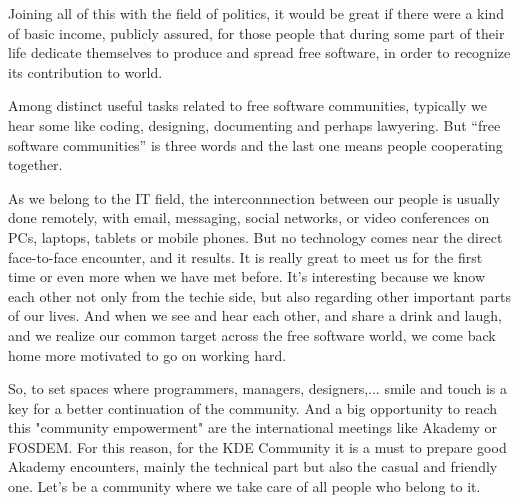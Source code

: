 Joining all of this with the field of politics, it would be great if there were a kind of basic income, publicly assured, for those people that during some part of their life dedicate themselves to produce and spread free software, in order to recognize its contribution to world.

Among distinct useful tasks related to free software communities, typically we hear some like coding, designing, documenting and perhaps lawyering. But ``free software communities'' is three words and the last one means people cooperating together.

As we belong to the IT field, the interconnnection between our people is usually done remotely, with email, messaging, social networks, or video conferences on PCs, laptops, tablets or mobile phones. But no technology comes near the direct face-to-face encounter, and it results. It is really great to meet us for the first time or even more when we have met before. It's interesting because we know each other not only from the techie side, but also regarding other important parts of our lives. And when we see and hear each other, and share a drink and laugh, and we realize our common target across the free software world, we come back home more motivated to go on working hard.

So, to set spaces where programmers, managers, designers,... smile and touch is a key for a better continuation of the community. And a big opportunity to reach this "community empowerment" are the international meetings like Akademy or FOSDEM. For this reason, for the KDE Community it is a must to prepare good Akademy encounters, mainly the technical part but also the casual and friendly one. Let's be a community where we take care of all people who belong to it.